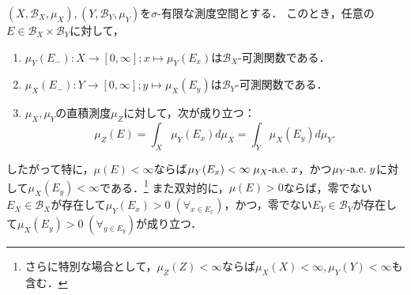 \documentclass[uplatex, dvipdfmx]{jsreport}
\renewcommand{\B}{\mathcal{B}}
\begin{document}
\begin{theorem}\label{thm-Fubini-I}
    $(X,\B_X,\mu_X),(Y,\B_Y,\mu_Y)$を$\sigma$-有限な測度空間とする．
    このとき，任意の$E\in\B_X\times\B_Y$に対して，
    \begin{enumerate}
        \item $\mu_Y(E_-):X\to[0,\infty];x\mapsto\mu_Y(E_x)$は$\B_X$-可測関数である．
        \item $\mu_X(E_-):Y\to[0,\infty];y\mapsto\mu_X(E_y)$は$\B_Y$-可測関数である．
        \item $\mu_X,\mu_Y$の直積測度$\mu_Z$に対して，次が成り立つ：
        \[\mu_Z(E)=\int_X\mu_Y(E_x)d\mu_X=\int_Y\mu_X(E_y)d\mu_Y.\]
    \end{enumerate}
    したがって特に，$\mu(E)<\infty$ならば$\mu_Y(E_x)<\infty\;\mu_X\textrm{-a.e.}\; x$，かつ$\mu_Y\textrm{-a.e.}\; y$に対して$\mu_X(E_y)<\infty$である．\footnote{さらに特別な場合として，$\mu_Z(Z)<\infty$ならば$\mu_X(X)<\infty,\mu_Y(Y)<\infty$も含む．}
    また双対的に，$\mu(E)>0$ならば，零でない$E_X\in\B_X$が存在して$\mu_Y(E_x)>0\;(\forall_{x\in E_x})$，かつ，零でない$E_Y\in\B_Y$が存在して$\mu_X(E_y)>0\;(\forall_{y\in E_y})$が成り立つ．
\end{theorem}
\end{document}
